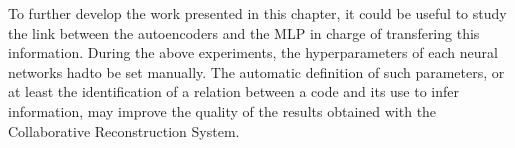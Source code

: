 To further develop the work presented in this chapter, it could be useful to study the link between the autoencoders and the MLP in charge of transfering this information. During the above experiments, the hyperparameters of each neural networks hadto be set manually. The automatic definition of such parameters, or at least the identification of a relation between a code and its use to infer information, may improve the quality of the results obtained with the Collaborative Reconstruction System.
